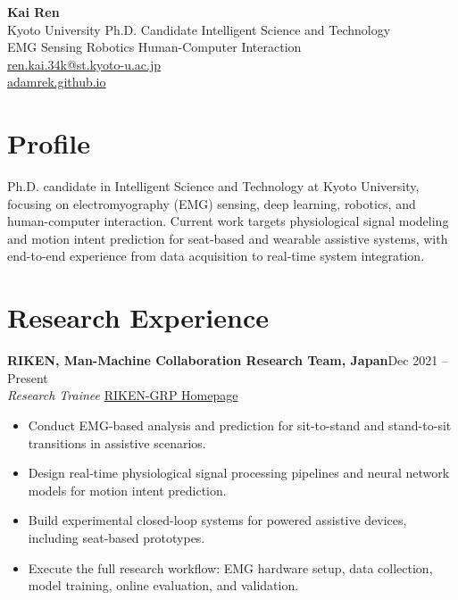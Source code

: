 \documentclass[10pt,letterpaper]{article}
\newcommand{\entry}[2]{\textbf{#1}\hfill #2}
\newcommand{\link}[2]{\href{#1}{#2}}
\begin{document}
\fontsize{9.4}{10.2}\selectfont

\begin{center}
  {\Large \textbf{Kai Ren}}\\[-0.15em]
  Kyoto University \textbar{} Ph.D. Candidate \textbar{} Intelligent Science and Technology\\
  EMG Sensing \textbar{} Robotics \textbar{} Human-Computer Interaction\\
  \href{mailto:ren.kai.34k@st.kyoto-u.ac.jp}{ren.kai.34k@st.kyoto-u.ac.jp}\\
  \href{https://adamrek.github.io}{adamrek.github.io}
\end{center}
\vspace{-0.4em}

\section*{Profile}
Ph.D. candidate in Intelligent Science and Technology at Kyoto University, focusing on electromyography (EMG) sensing, deep learning, robotics, and human-computer interaction. Current work targets physiological signal modeling and motion intent prediction for seat-based and wearable assistive systems, with end-to-end experience from data acquisition to real-time system integration.

\section*{Research Experience}
\entry{RIKEN, Man-Machine Collaboration Research Team, Japan}{Dec 2021 -- Present}\\
\textit{Research Trainee} \hfill \link{https://grp.riken.jp/labs/man_machine_collab/}{RIKEN-GRP Homepage}
\begin{itemize}
  \item Conduct EMG-based analysis and prediction for sit-to-stand and stand-to-sit transitions in assistive scenarios.
  \item Design real-time physiological signal processing pipelines and neural network models for motion intent prediction.
  \item Build experimental closed-loop systems for powered assistive devices, including seat-based prototypes.
  \item Execute the full research workflow: EMG hardware setup, data collection, model training, online evaluation, and validation.
\end{itemize}
\end{document}
